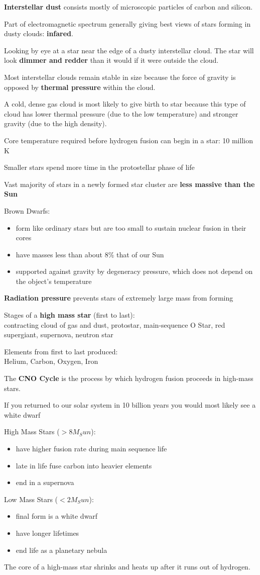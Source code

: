 {\bf Interstellar dust} consists mostly of microscopic particles of carbon and silicon.

Part of electromagnetic spectrum generally giving best views of stars forming in dusty clouds: {\bf infared}.

Looking by eye at a star near the edge of a dusty interstellar cloud. The star will look {\bf dimmer and redder} than it would if it were outside the cloud.

Most interstellar clouds remain stable in size because the force of gravity is opposed by {\bf thermal pressure} within the cloud.

A cold, dense gas cloud is most likely to give birth to star because this type of cloud has lower thermal pressure (due to the low temperature) and stronger gravity (due to the high density).

Core temperature required before hydrogen fusion can begin in a star: 10 million K

Smaller stars spend more time in the protostellar phase of life

Vast majority of stars in a newly formed star cluster are {\bf less massive than the Sun}

Brown Dwarfs:
\begin{itemize}
\item form like ordinary stars but are too small to sustain nuclear fusion in their cores
\item have masses less than about 8\% that of our Sun
\item supported against gravity by degeneracy pressure, which does not depend on the object's temperature
\end{itemize}
{\bf Radiation pressure} prevents stars of extremely large mass from forming

Stages of a {\bf high mass star} (first to last):\\
contracting cloud of gas and dust, protostar, main-sequence O Star, red supergiant, supernova, neutron star

Elements from first to last produced: \\
Helium, Carbon, Oxygen, Iron

The {\bf CNO Cycle} is the process by which hydrogen fusion proceeds in high-mass stars.

If you returned to our solar system in 10 billion years you would most likely see a white dwarf

High Mass Stars ($>8M_Sun$):
\begin{itemize}
\item have higher fusion rate during main sequence life
\item late in life fuse carbon into heavier elements
\item end in a supernova
\end{itemize}
Low Mass Stars ($<2M_Sun$):
\begin{itemize}
\item final form is a white dwarf
\item have longer lifetimes
\item end life as a planetary nebula
\end{itemize}
The core of a high-mass star shrinks and heats up after it runs out of hydrogen.

